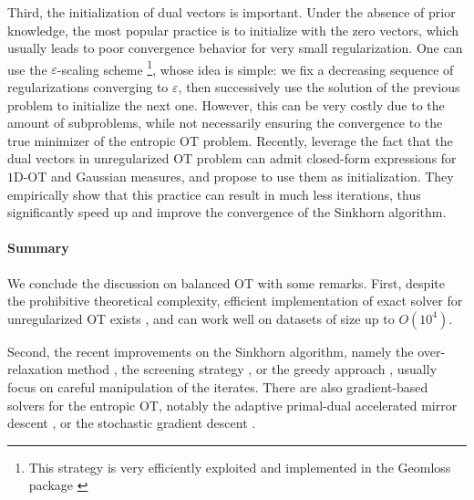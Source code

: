 Third, the initialization of dual vectors is important.
Under the absence of prior knowledge, the most popular practice is to initialize with
the zero vectors, which usually leads to poor convergence behavior for very small regularization.
One can use the $\varepsilon$-scaling scheme \citep{Schmitzer19}
\footnote{This strategy is very efficiently exploited and implemented in the Geomloss package
\citep{Feydy19}}, whose idea is simple: we fix a decreasing sequence of regularizations
converging to $\varepsilon$, then successively use the solution of the previous problem to
initialize the next one. However, this can be very costly due to the amount of subproblems,
while not necessarily ensuring the convergence to the true minimizer of the entropic OT problem.
Recently, \citet{Thornton23a} leverage the fact that the dual vectors in unregularized OT problem
can admit closed-form expressions for $1$D-OT and Gaussian measures, and propose to use them
as initialization. They empirically show that this practice can result in much less iterations,
thus significantly speed up and improve the convergence of the Sinkhorn algorithm.

\paragraph{Summary} \label{para:summary}
We conclude the discussion on balanced OT with some remarks.
First, despite the prohibitive theoretical complexity,
efficient implementation of exact solver for unregularized OT exists \citep{Flamary21},
and can work well on datasets of size up to $O(10^4)$.

Second, the recent improvements on the Sinkhorn algorithm,
namely the over-relaxation method \citep{Lehmann21,Thibault21}, the screening strategy \citep{Alaya19},
or the greedy approach \citep{Altschuler17,Lin20,Kostic21}, usually focus on careful manipulation
of the iterates. There are also gradient-based solvers for the entropic OT, notably
the adaptive primal-dual accelerated mirror descent \citep{Dvurechensky18,Lin22},
or the stochastic gradient descent \citep{Abid18,Genevay16,Seguy18}.

